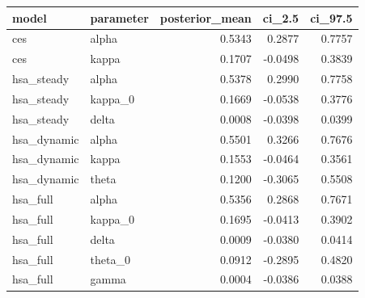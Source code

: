 \begin{tabular}{llrrr}
\toprule
model & parameter & posterior\_mean & ci\_2.5 & ci\_97.5 \\
\midrule
ces & alpha & 0.5343 & 0.2877 & 0.7757 \\
ces & kappa & 0.1707 & -0.0498 & 0.3839 \\
hsa\_steady & alpha & 0.5378 & 0.2990 & 0.7758 \\
hsa\_steady & kappa\_0 & 0.1669 & -0.0538 & 0.3776 \\
hsa\_steady & delta & 0.0008 & -0.0398 & 0.0399 \\
hsa\_dynamic & alpha & 0.5501 & 0.3266 & 0.7676 \\
hsa\_dynamic & kappa & 0.1553 & -0.0464 & 0.3561 \\
hsa\_dynamic & theta & 0.1200 & -0.3065 & 0.5508 \\
hsa\_full & alpha & 0.5356 & 0.2868 & 0.7671 \\
hsa\_full & kappa\_0 & 0.1695 & -0.0413 & 0.3902 \\
hsa\_full & delta & 0.0009 & -0.0380 & 0.0414 \\
hsa\_full & theta\_0 & 0.0912 & -0.2895 & 0.4820 \\
hsa\_full & gamma & 0.0004 & -0.0386 & 0.0388 \\
\bottomrule
\end{tabular}
